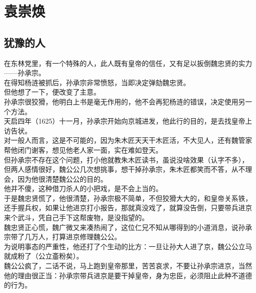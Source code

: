 \section{袁崇焕}
\ifnum{}
	\begin{multicols}{\theparacolNo}
\fi
\subsection{犹豫的人}
在东林党里，有一个特殊的人，此人既有皇帝的信任，又有足以扳倒魏忠贤的实力——孙承宗。\\

在得知杨涟被抓后，孙承宗非常愤怒，当即决定弹劾魏忠贤。\\

但他想了一下，便改变了主意。\\

孙承宗很狡猾，他明白上书是毫无作用的，他不会再犯杨涟的错误，决定使用另一个方法。\\

天启四年（1625）十一月，孙承宗开始向京城进发，他此行的目的，是去找皇帝上访告状。\\

对一般人而言，这是不可能的，因为朱木匠天天干木匠活，不大见人，还有魏管家帮他闭门谢客，想见他老人家一面，实在难如登天。\\

但孙承宗不存在这个问题，打小他就教朱木匠读书，虽说没啥效果（认字不多），但两人感情很好，魏公公几次想挑事，想干掉孙承宗，朱木匠都笑而不答，从不理会，因为他很清楚魏公公的目的。\\

他并不傻，这种借刀杀人的小把戏，是不会上当的。\\

于是魏忠贤慌了，他很清楚，孙承宗极不简单，不但狡猾大大的，和皇帝关系铁，还手握兵权，如果让他进京打小报告，那就真没戏了，就算没告倒，只要带兵进京来个武斗，凭自己手下这帮废物，是没指望的。\\

魏忠贤正心慌，魏广微又来凑热闹了，这位仁兄不知从哪得到的小道消息，说孙承宗带了几万人，打算进京修理魏公公。\\

为说明事态的严重性，他还打了个生动的比方：一旦让孙大人进了京，魏公公立马就成粉了（公立齑粉矣）。\\

魏公公疯了，二话不说，马上跑到皇帝那里，苦苦哀求，不要让孙承宗进京，当然他的理由很正当：孙承宗带兵进京是要干掉皇帝，身为忠臣，必须阻止此种不道德的行为。\\


\end{multicols}

